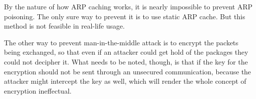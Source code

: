 \documentclass[12pt]{article}
\begin{document}
By the nature of how ARP caching works, it is nearly impossible to prevent ARP
poisoning. The only sure way to prevent it is to use static ARP cache. But this
method is not feasible in real-life usage.

The other way to prevent man-in-the-middle attack is to encrypt the packets
being exchanged, so that even if an attacker could get hold of the packages they
could not decipher it. What needs to be noted, though, is that if the key for
the encryption should not be sent through an unsecured communication, because
the attacker might intercept the key as well, which will render the whole
concept of encryption ineffectual.
\end{document}
